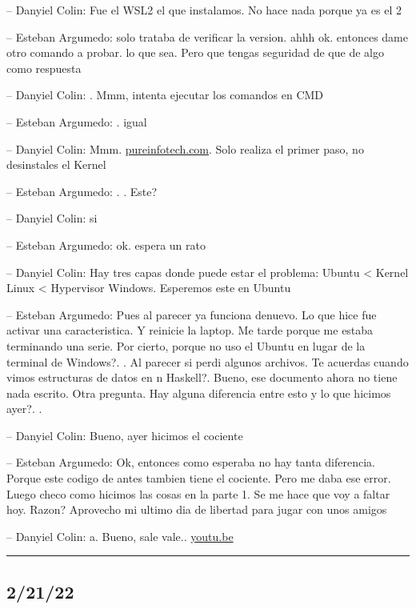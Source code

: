 -- Danyiel Colin: Fue el WSL2 el que instalamos. No hace nada porque ya
es el 2

-- Esteban Argumedo: solo trataba de verificar la version. ahhh ok.
entonces dame otro comando a probar. lo que sea. Pero que tengas
seguridad de que de algo como respuesta

-- Danyiel Colin: . Mmm, intenta ejecutar los comandos en CMD

-- Esteban Argumedo: . igual

-- Danyiel Colin: Mmm.
\href{https://pureinfotech.com/uninstall-wsl2-windows-10/}{pureinfotech.com}.
Solo realiza el primer paso, no desinstales el Kernel

-- Esteban Argumedo: . . Este?

-- Danyiel Colin: si

-- Esteban Argumedo: ok. espera un rato

-- Danyiel Colin: Hay tres capas donde puede estar el problema: Ubuntu
\textless{} Kernel Linux \textless{} Hypervisor Windows. Esperemos este
en Ubuntu

-- Esteban Argumedo: Pues al parecer ya funciona denuevo. Lo que hice
fue activar una caracteristica. Y reinicie la laptop. Me tarde porque me
estaba terminando una serie. Por cierto, porque no uso el Ubuntu en
lugar de la terminal de Windows?. . Al parecer si perdi algunos
archivos. Te acuerdas cuando vimos estructuras de datos en n Haskell?.
Bueno, ese documento ahora no tiene nada escrito. Otra pregunta. Hay
alguna diferencia entre esto y lo que hicimos ayer?. .

-- Danyiel Colin: Bueno, ayer hicimos el cociente

-- Esteban Argumedo: Ok, entonces como esperaba no hay tanta diferencia.
Porque este codigo de antes tambien tiene el cociente. Pero me daba ese
error. Luego checo como hicimos las cosas en la parte 1. Se me hace que
voy a faltar hoy. Razon? Aprovecho mi ultimo dia de libertad para jugar
con unos amigos

-- Danyiel Colin: a. Bueno, sale vale..
\href{https://youtu.be/ceaNqdHdqtg}{youtu.be}

\begin{center}\rule{0.5\linewidth}{0.5pt}\end{center}

\hypertarget{section-13}{%
\subsection{2/21/22}\label{section-13}}

